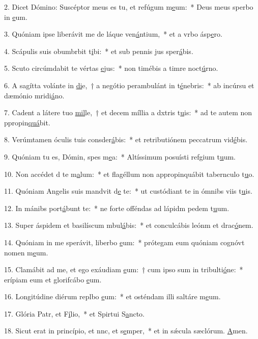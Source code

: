 2. Dicet Dómino: Suscéptor meus es tu, et refúgum m\uline{e}um:~* Deus meus sperbo in \uline{e}um.\par 
3. Quóniam ipse liberávit me de láque ven\uline{á}ntium,~* et a vrbo ásp\uline{e}ro.\par 
4. Scápulis suis obumbrbit t\uline{i}bi:~* et sub pennis jus sper\uline{á}bis.\par 
5. Scuto circúmdabit te vértas \uline{e}jus:~* non timébis a timre noct\uline{ú}rno.\par 
6. A sagítta volánte in \uline{di}e,~† a negótio perambulánt in t\uline{é}nebris:~* ab incúrsu et dæmónio mridi\uline{á}no.\par 
7. Cadent a látere tuo \uline{mil}le,~† et decem míllia a dxtris t\uline{u}is:~* ad te autem non ppropin\uline{quá}bit.\par 
8. Verúmtamen óculis tuis consder\uline{á}bis:~* et retributiónem peccatrum vid\uline{é}bis.\par 
9. Quóniam tu es, Dómin, spes m\uline{e}a:~* Altíssimum posuísti refgium t\uline{u}um.\par 
10. Non accédet d te m\uline{a}lum:~* et flagéllum non appropinquábit tabernculo t\uline{u}o.\par 
11. Quóniam Angelis suis mandvit d\uline{e} te:~* ut custódiant te in ómnibs viis t\uline{u}is.\par 
12. In mánibs port\uline{á}bunt te:~* ne forte offéndas ad lápidm pedem t\uline{u}um.\par 
13. Super áspidem et basilíscum mbul\uline{á}bis:~* et conculcábis leónm et drac\uline{ó}nem.\par 
14. Quóniam in me sperávit, liberbo \uline{e}um:~* prótegam eum quóniam cognóvt nomen m\uline{e}um.\par 
15. Clamábit ad me, et ego exáudiam \uline{e}um:~† cum ipso sum in tribulti\uline{ó}ne:~* erípiam eum et glorifcábo \uline{e}um.\par 
16. Longitúdine diérum replbo \uline{e}um:~* et osténdam illi saltáre m\uline{e}um.\par 
17. Glória Patr, et F\uline{í}lio,~* et Spirtui S\uline{a}ncto.\par 
18. Sicut erat in princípio, et nnc, et s\uline{e}mper,~* et in sǽcula sæclórum. \uline{A}men.\par 
